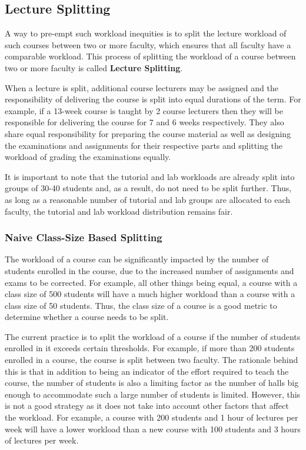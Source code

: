 \subsection{Lecture Splitting}
\label{sec:lecture_splitting}

A way to pre-empt such workload inequities is to split the lecture workload of such courses between two or more faculty, which ensures that all faculty have a comparable workload. This process of splitting the workload of a course between two or more faculty is called \textbf{Lecture Splitting}.

When a lecture is split, additional course lecturers may be assigned and the responsibility of delivering the course is split into equal durations of the term. For example, if a 13-week course is taught by
2 course lecturers then they will be responsible for delivering the course for 7 and 6 weeks respectively. They also share equal responsibility for preparing the course material as well as designing the examinations and assignments for their respective parts and splitting the workload of grading the examinations equally.

It is important to note that the tutorial and lab workloads are already split into groups of 30-40 students and, as a result, do not need to be split further. Thus, as long as a reasonable number of tutorial and lab groups are allocated to each faculty, the tutorial and lab workload distribution remains fair.


\subsubsection{Naive Class-Size Based Splitting}

The workload of a course can be significantly impacted by the number of students enrolled in the course, due to the increased number of assignments and exams to be corrected. For example, all other things being equal, a course with a class size of 500 students will have a much higher workload than a course with a class size of 50 students. Thus, the class size of a course is a good metric to determine whether a course needs to be split.

The current practice is to split the workload of a course if the number of students enrolled in it exceeds certain thresholds. For example, if more than 200 students enrolled in a course, the course is split between two faculty. The rationale behind this is that in addition to being an indicator of the effort required to teach the course, the number of students is also a limiting factor as the number of halls big enough to accommodate such a large number of students is limited. However, this is not a good strategy as it does not take into account other factors that affect the workload. For example, a course with 200 students and 1 hour of lectures per week will have a lower workload than a new course with 100 students and 3 hours of lectures per week.

